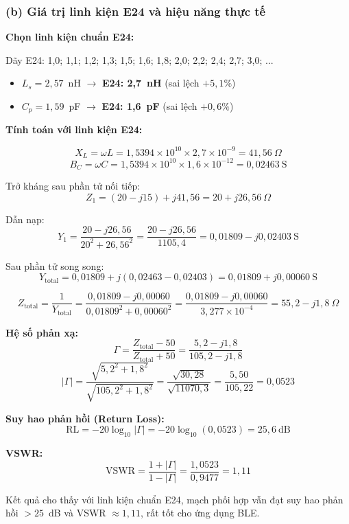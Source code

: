 \documentclass[12pt,a4paper]{article}
\begin{document}
\subsubsection{(b) Giá trị linh kiện E24 và hiệu năng thực tế}

\textbf{Chọn linh kiện chuẩn E24:}

Dãy E24: 1{,}0; 1{,}1; 1{,}2; 1{,}3; 1{,}5; 1{,}6; 1{,}8; 2{,}0; 2{,}2; 2{,}4; 2{,}7; 3{,}0; ...

\begin{itemize}
    \item $L_s = 2{,}57$~nH $\to$ \textbf{E24: 2{,}7~nH} (sai lệch $+5{,}1\%$)
    \item $C_p = 1{,}59$~pF $\to$ \textbf{E24: 1{,}6~pF} (sai lệch $+0{,}6\%$)
\end{itemize}

\textbf{Tính toán với linh kiện E24:}

\[
X_L = \omega L = 1{,}5394 \times 10^{10} \times 2{,}7 \times 10^{-9} = 41{,}56~\Omega
\]
\[
B_C = \omega C = 1{,}5394 \times 10^{10} \times 1{,}6 \times 10^{-12} = 0{,}02463~\text{S}
\]

Trở kháng sau phần tử nối tiếp:
\[
Z_1 = (20 - j15) + j41{,}56 = 20 + j26{,}56~\Omega
\]

Dẫn nạp:
\[
Y_1 = \frac{20 - j26{,}56}{20^2 + 26{,}56^2} = \frac{20 - j26{,}56}{1105{,}4} = 0{,}01809 - j0{,}02403~\text{S}
\]

Sau phần tử song song:
\[
Y_{\text{total}} = 0{,}01809 + j(0{,}02463 - 0{,}02403) = 0{,}01809 + j0{,}00060~\text{S}
\]

\[
Z_{\text{total}} = \frac{1}{Y_{\text{total}}} = \frac{0{,}01809 - j0{,}00060}{0{,}01809^2 + 0{,}00060^2} = \frac{0{,}01809 - j0{,}00060}{3{,}277 \times 10^{-4}} = 55{,}2 - j1{,}8~\Omega
\]

\textbf{Hệ số phản xạ:}
\[
\Gamma = \frac{Z_{\text{total}} - 50}{Z_{\text{total}} + 50} = \frac{5{,}2 - j1{,}8}{105{,}2 - j1{,}8}
\]
\[
|\Gamma| = \frac{\sqrt{5{,}2^2 + 1{,}8^2}}{\sqrt{105{,}2^2 + 1{,}8^2}} = \frac{\sqrt{30{,}28}}{\sqrt{11070{,}3}} = \frac{5{,}50}{105{,}22} = \boxed{0{,}0523}
\]

\textbf{Suy hao phản hồi (Return Loss):}
\[
\text{RL} = -20\log_{10}|\Gamma| = -20\log_{10}(0{,}0523) = \boxed{25{,}6~\text{dB}}
\]

\textbf{VSWR:}
\[
\text{VSWR} = \frac{1 + |\Gamma|}{1 - |\Gamma|} = \frac{1{,}0523}{0{,}9477} = \boxed{1{,}11}
\]

Kết quả cho thấy với linh kiện chuẩn E24, mạch phối hợp vẫn đạt suy hao phản hồi $> 25$~dB và VSWR $\approx 1{,}11$, rất tốt cho ứng dụng BLE.
\end{document}
